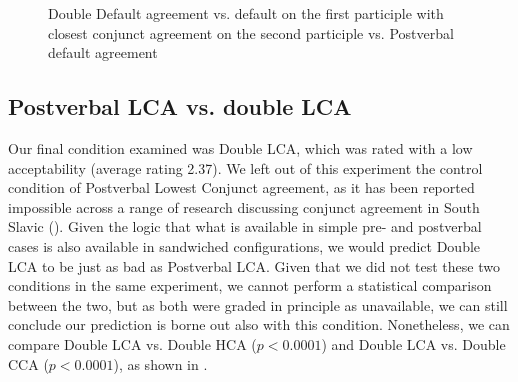 \documentclass[output=paper
,modfonts
,nonflat]{langsci/langscibook}
\begin{document}
\begin{figure}[H]
\caption{Double Default agreement vs. default on the first participle with closest conjunct agreement on the second participle vs. Postverbal default agreement\label{fig:figure_defdef_defcca_postvdef}}
\end{figure}


\subsection{Postverbal LCA vs. double LCA}
Our final condition examined was Double LCA, which was rated with a low acceptability (average rating 2.37). We left out of this experiment the control condition of Postverbal Lowest Conjunct agreement, as it has been reported impossible across a range of research discussing conjunct agreement in South Slavic (\citealt{marusicnevinsbadecker:15,boskovic:09,puskarmurphy:17,willergold:16}). Given the logic that what is available in simple pre- and postverbal cases is also available in sandwiched configurations, we would predict Double LCA to be just as bad as Postverbal LCA. Given that we did not test these two conditions in the same experiment, we cannot perform a statistical comparison between the two, but as both were graded in principle as unavailable, we can still conclude our prediction is borne out also with this condition. Nonetheless, we can compare Double LCA vs. Double HCA ($p < 0.0001$) and Double LCA vs. Double CCA ($p < 0.0001$), as shown in . 

\end{document}

